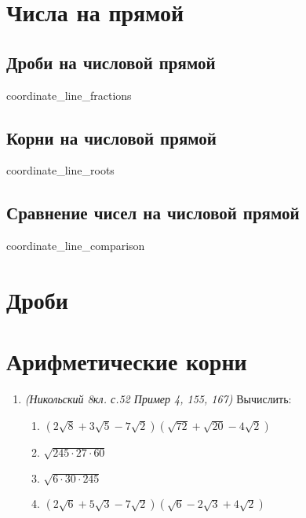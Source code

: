 \documentclass[12pt, a4paper]{article}
\begin{document}
 
\section{Числа на прямой}
	\subsection{Дроби на числовой прямой}
	{coordinate_line_fractions}
	\subsection{Корни на числовой прямой}
	{coordinate_line_roots}
	\subsection{Сравнение чисел на числовой прямой}
	{coordinate_line_comparison}
\section{Дроби}
\section{Арифметические корни}
\begin{enumerate}
	\item \textit{(Никольский 8кл. с.52 Пример 4, 155, 167)} Вычислить:
	\begin{enumerate}[label=\asbuk*)]
		\item $(2\sqrt{8}+3\sqrt{5}-7\sqrt{2})(\sqrt{72}+\sqrt{20}-4\sqrt{2})$
		\item  $\sqrt{245 \cdot 27 \cdot 60}$
		\item $\sqrt{6 \cdot 30 \cdot 245}$
		\item $(2\sqrt{6}+5\sqrt{3}-7\sqrt{2})(\sqrt{6}-2\sqrt{3}+4\sqrt{2})$
	\end{enumerate}
\end{enumerate}
\end{document}
